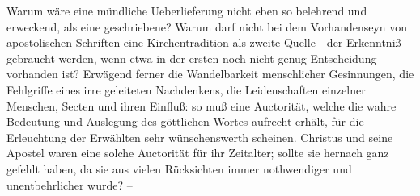\begin{aufza}
{Warum wäre eine mündliche Ueberlieferung nicht eben so belehrend und erweckend, als eine geschriebene? Warum darf nicht bei dem Vorhandenseyn von apostolischen Schriften eine Kirchentradition als zweite Quelle~\ der Erkenntniß gebraucht werden, wenn etwa in der ersten noch nicht genug Entscheidung vorhanden ist? Erwägend ferner die Wandelbarkeit menschlicher Gesinnungen, die Fehlgriffe eines irre geleiteten Nachdenkens, die Leidenschaften einzelner Menschen, Secten und ihren Einfluß: so muß eine Auctorität, welche die wahre Bedeutung und Auslegung des göttlichen Wortes aufrecht erhält, für die Erleuchtung der Erwählten sehr wünschenswerth scheinen. Christus und seine Apostel waren eine solche Auctorität für ihr Zeitalter; sollte sie hernach ganz gefehlt haben, da sie aus vielen Rücksichten immer nothwendiger und unentbehrlicher wurde?} --~
\end{aufza}


